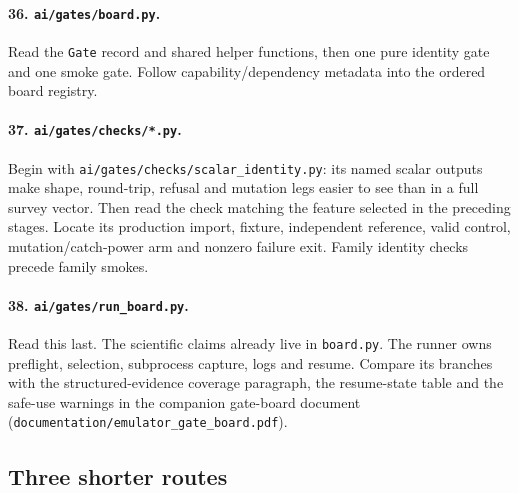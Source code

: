 \documentclass[10pt,aps,prd,twocolumn,nofootinbib]{revtex4-2}
\newcommand{\code}[1]{\texttt{#1}}
\begin{document}
\paragraph{36.  \code{ai/gates/board.py}.}
Read the \code{Gate} record and shared helper functions, then one pure identity
gate and one smoke gate.  Follow capability/dependency metadata into the
ordered board registry.

\paragraph{37.  \code{ai/gates/checks/*.py}.}
Begin with \code{ai/gates/checks/scalar\_identity.py}: its named scalar outputs
make shape, round-trip, refusal and mutation legs easier to see than in a
full survey vector.  Then read the check matching the feature selected in the
preceding stages.  Locate its production import,
fixture, independent reference, valid control, mutation/catch-power arm and
nonzero failure exit.  Family identity checks precede family smokes.

\paragraph{38.  \code{ai/gates/run\_board.py}.}
Read this last.  The scientific claims already live in \code{board.py}.  The
runner owns preflight, selection, subprocess capture, logs and resume.  Compare
its branches with the structured-evidence coverage paragraph, the resume-state
table and the safe-use warnings in the companion gate-board document
(\code{documentation/emulator\_gate\_board.pdf}).

\subsection{Three shorter routes}
\end{document}
